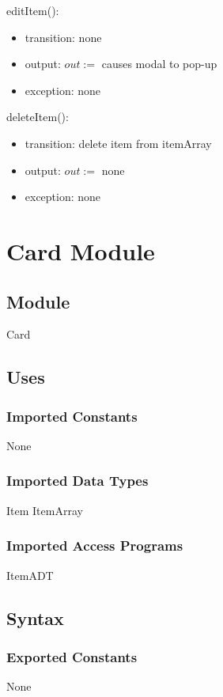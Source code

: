 \documentclass[12pt]{article}
\begin{document}
\noindent editItem():
\begin{itemize}
  \item transition: none
  \item output: $out :=$ causes modal to pop-up
  \item exception: none
\end{itemize}

\noindent deleteItem():
\begin{itemize}
  \item transition: delete item from itemArray
  \item output: $out :=$ none
  \item exception: none
\end{itemize}








\newpage
\section*{Card Module}

\subsection{Module}
Card

\bigskip
\subsection{Uses}
\subsubsection{Imported Constants}
None

\subsubsection{Imported Data Types}
Item
ItemArray

\subsubsection{Imported Access Programs}
ItemADT

\bigskip
\subsection{Syntax}
\subsubsection{Exported Constants}
None
\end{document}
